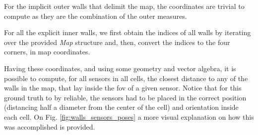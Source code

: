 \documentclass[runningheads]{llncs}
\begin{document}
For the implicit outer walls that delimit the map, the coordinates are trivial to compute as they are the combination of the outer measures. 

For all the explicit inner walls, we first obtain the indices of all walls by iterating over the provided \emph{Map} structure and, then, convert the indices to the four corners, in map coordinates.

Having these coordinates, and using some geometry and vector algebra, it is possible to compute, for all sensors in all cells, the closest distance to any of the walls in the map, that lay inside the \gls{fov} of a given sensor. Notice that for this ground truth to by reliable, the sensors had to be placed in the correct position (distancing half a diameter from the center of the cell) and orientation inside each cell. On Fig. \ref{fig:walls_sensors_poses} a more visual explanation on how this was accomplished is provided.
\end{document}
